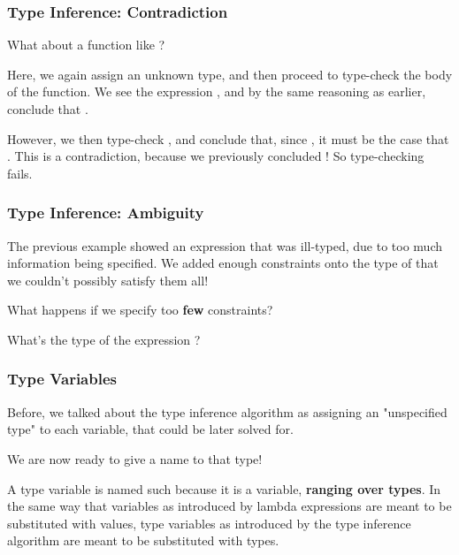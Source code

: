 \documentclass[aspectratio=169]{beamer}
\begin{document}
\begin{frame}[fragile]
  \frametitle{Type Inference: Contradiction}

  What about a function like ?

  \pause
  \vspace{\fill}

  Here, we again assign  an unknown type, and then proceed
  to type-check the body of the function. We see the expression
  , and by the same reasoning as earlier, conclude that
  .

  \pause
  \vspace{\fill}

  However, we then type-check , and conclude that,
  since , it must be the case
  that . This is a contradiction, because we
  previously concluded ! So type-checking fails.
\end{frame}

\begin{frame}[fragile]
  \frametitle{Type Inference: Ambiguity}

  The previous example showed an expression that was ill-typed,
  due to too much information being specified. We added enough
  constraints onto the type of  that we couldn't possibly
  satisfy them all!

  \pause
  \vspace{\fill}

  What happens if we specify too \textbf{few} constraints?

  \pause
  \vspace{\fill}

  What's the type of the expression ?
\end{frame}


\begin{frame}[fragile]
  \frametitle{Type Variables}

  Before, we talked about the type inference algorithm as assigning an
  "unspecified type" to each variable, that could be later solved for.

  \pause
  \vspace{\fill}

  We are now ready to give a name to that type!

  \pause
  \vspace{\fill}


  \pause
  \vspace{\fill}

  A type variable is named such because it is a variable, \textbf{ranging
  over types}. In the same way that variables as introduced by lambda expressions
  are meant to be substituted with values, type variables as introduced by
  the type inference algorithm are meant to be substituted with types.
\end{frame}
\end{document}

